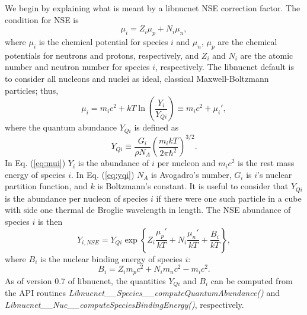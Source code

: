 \documentclass{article}    %
\begin{document}
We begin by explaining
what is meant by a libnucnet NSE correction factor.
The condition for
NSE is
\begin{equation}
\mu_i = Z_i \mu_p + N_i \mu_n, \label{eq:nse_condition}
\end{equation}
where $\mu_i$ is the chemical potential for species $i$ and $\mu_n$, $\mu_p$
are the chemical potentials for neutrons and protons, respectively, and
$Z_i$ and $N_i$ are the atomic number and neutron number for species $i$, 
respectively.  The libnucnet default is to consider all nucleons and nuclei
as ideal, classical Maxwell-Boltzmann particles; thus,
\begin{equation}
\mu_i = m_i c^2 + kT \ln\left(\frac{Y_i}{Y_{Qi}}\right)
\equiv m_i c^2 + \mu_i',\label{eq:classical_mu}
\label{eq:mui}
\end{equation}
where the quantum abundance $Y_{Qi}$ is defined as
\begin{equation}
Y_{Qi} \equiv \frac{G_i}{\rho N_A}
\left(\frac{m_i kT}{2\pi\hbar^2}\right)^{3/2}.
\label{eq:yqi}
\end{equation}
In Eq. (\ref{eq:mui}) $Y_i$ is the abundance of $i$ per nucleon and
$m_ic^2$ is the rest mass energy of species $i$.
In Eq. (\ref{eq:yqi})
$N_A$ is Avogadro's number,
$G_i$ is $i$'s nuclear partition function, and $k$ is Boltzmann's constant.
It is useful to consider that $Y_{Qi}$ is the abundance per nucleon of species
$i$ if there were one such particle in a cube with side
one thermal de Broglie wavelength in length.
The NSE abundance of species $i$ is then
\begin{equation}
Y_{i,NSE} = Y_{Qi}\exp\left\{Z_i \frac{\mu_p'}{kT} + N_i \frac{\mu_n'}{kT}
+ \frac{B_i}{kT}\right\}, \label{eq:y_i_nse}
\end{equation}
where $B_i$ is the nuclear binding energy of species $i$:
\begin{equation}
B_i = Z_i m_pc^2 + N_i m_nc^2 - m_ic^2.\label{eq:binding}
\end{equation}
As of version 0.7 of libnucnet, the quantities $Y_{Qi}$ and $B_i$ can be
computed from the API routines
{\em Libnucnet\_\_Species\_\_computeQuantumAbundance()}
and
{\em Libnucnet\_\_Nuc\_\_computeSpeciesBindingEnergy()},
respectively.
\end{document}
